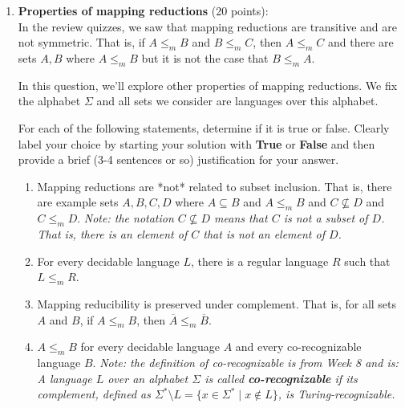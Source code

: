 \begin{enumerate} 

\item \textbf{Properties of mapping reductions} (20 points): \\
In the review quizzes, we saw that
mapping reductions are transitive and are
not symmetric. That is, if $A \le_m B$ and $B \le_m C$, then $A \le_m C$ and there are sets 
$A, B$ where $A \le_m B$ but it is not 
the case that $B \le_m A$.

In this question, we'll explore other 
properties of mapping reductions.
We fix the alphabet $\Sigma$ and 
all sets we consider are languages
over this alphabet.

For each of the following statements, determine if it is true or false. 
Clearly label your choice 
by starting your solution with {\bf True} or {\bf False} and then
provide a brief (3-4 sentences or so) justification for your answer.

\begin{enumerate}
\item\gradeCorrectFirst Mapping reductions are *not* related to subset inclusion. 
That is, there are example sets $A,B,C,D$ where
$A \subseteq B$ and $A \leq_m B$ and 
$C \not \subseteq D$ and $C \leq_m D$.
{\it Note: the notation $C \not \subseteq D$ means 
that $C$ is not a subset of $D$. That is, there is 
an element of $C$ that is not an element of $D$.}

\item\gradeCorrect For every decidable language $L$, there is a regular language 
$R$ such that $L \le_m R$.

\item\gradeCorrect Mapping reducibility is preserved under complement. That is, 
for all sets $A$ and $B$, if $A \le_m B$, then $\overline{A} \le_m \overline{B}$.

\item\gradeCorrect $A \le_m B$ for every decidable language $A$ and every co-recognizable language $B$. {\it Note: the definition of co-recognizable
is from Week 8 and is: A language $L$ over an  alphabet 
$\Sigma$ is called {\bf co-recognizable} if its complement,  defined
as $\Sigma^* \setminus L  = \{ x  \in  \Sigma^* \mid x \notin  L \}$,
is Turing-recognizable.
}

\end{enumerate}




\end{enumerate}

